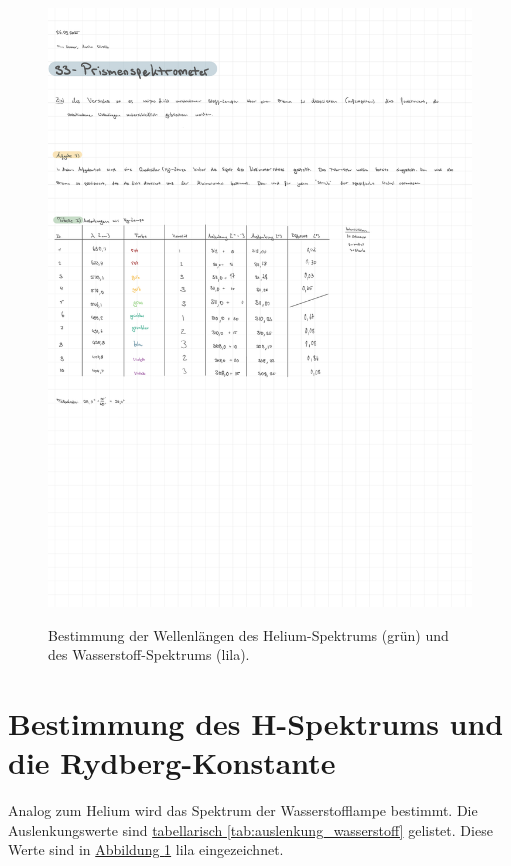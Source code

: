 \begin{figure}
    \centering
    \includegraphics[width=\textwidth, page=4]{Protokolle/33/Chapter/Messprotokoll.pdf}
    \label{fig:werte}
    \caption{Bestimmung der Wellenlängen des Helium-Spektrums (grün) und des Wasserstoff-Spektrums (lila).}
\end{figure}
\twocolumn

\section{Bestimmung des H-Spektrums und die Rydberg-Konstante}
Analog zum Helium wird das Spektrum der Wasserstofflampe bestimmt. Die Auslenkungswerte sind \hyperref[tab:auslenkung_wasserstoff]{tabellarisch \ref*{tab:auslenkung_wasserstoff}} gelistet. Diese Werte sind in \hyperref[fig:werte]{Abbildung \ref*{fig:werte}} lila eingezeichnet. 

